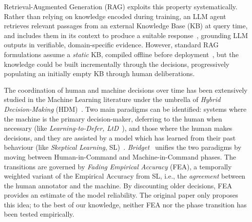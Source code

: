 \documentclass[a4paper,twoside]{article}
\begin{document}
Retrieval-Augmented Generation (RAG) exploits this property systematically. Rather than relying on knowledge encoded during training, an LLM agent retrieves relevant passages from an external Knowledge Base (KB) at query time, and includes them in its context to produce a suitable response~\cite{gao2023retrieval}, grounding LLM outputs in verifiable, domain-specific evidence. However, standard RAG formulations assume a \textit{static} KB, compiled offline before deployment~\cite{lewis2020retrieval}, but the knowledge could be built incrementally through the decisions, progressively populating an initially empty KB through human deliberations.

The coordination of human and machine decisions over time has been extensively studied in the Machine Learning literature under the umbrella of \textit{Hybrid Decision-Making} (HDM)~\cite{punzi2024ai}. Two main paradigms can be identified: systems where the machine is the primary decision-maker, deferring to the human when necessary (like \textit{Learning-to-Defer, LtD}~\cite{joshi2021learning}), and those where the human makes decisions, and they are assisted by a model which has learned from their past behaviour (like \textit{Skeptical Learning}, SL)~\cite{zhang2019personal,zeni2019fixing}.
\textit{Bridget}~\cite{pellungrini2025bridging} unifies the two paradigms by moving between Human-in-Command and Machine-in-Command phases. The transitions are governed by \textit{Fading Empirical Accuracy} (FEA), a temporally weighted variant of the Empirical Accuracy from SL, i.e., the \textit{agreement} between the human annotator and the machine. By discounting older decisions, FEA provides an estimate of the model reliability. The original paper only proposes this idea; to the best of our knowledge, neither FEA nor the phase transition has been tested empirically.
\end{document}
